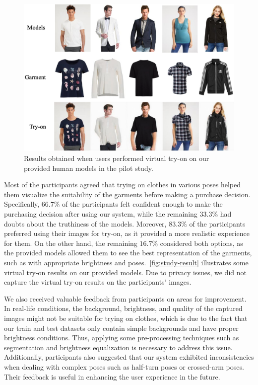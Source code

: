 \begin{figure}[h!]
  \centering
  \includegraphics[width=0.8\linewidth]{content/resources/images/application/study-result.png}
  \caption{Results obtained when users performed virtual try-on on our provided human models in the pilot study.}
  \label{fig:study-result}
  \vspace{-2mm}
\end{figure}

Most of the participants agreed that trying on clothes in various poses helped them visualize the suitability of the garments before making a purchase decision. Specifically, $66.7\%$ of the participants felt confident enough to make the purchasing decision after using our system, while the remaining $33.3\%$ had doubts about the truthiness of the models. Moreover, $83.3\%$ of the participants preferred using their images for try-on, as it provided a more realistic experience for them. On the other hand, the remaining $16.7\%$ considered both options, as the provided models allowed them to see the best representation of the garments, such as with appropriate brightness and poses.~\autoref{fig:study-result} illustrates some virtual try-on results on our provided models. Due to privacy issues, we did not capture the virtual try-on results on the participants' images.

We also received valuable feedback from participants on areas for improvement. In real-life conditions, the background, brightness, and quality of the captured images might not be suitable for trying on clothes, which is due to the fact that our train and test datasets only contain simple backgrounds and have proper brightness conditions. Thus, applying some pre-processing techniques such as segmentation and brightness equalization is necessary to address this issue. Additionally, participants also suggested that our system exhibited inconsistencies when dealing with complex poses such as half-turn poses or crossed-arm poses. Their feedback is useful in enhancing the user experience in the future.

